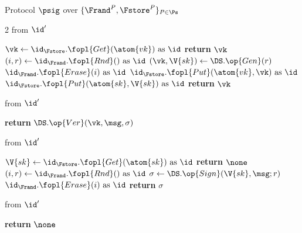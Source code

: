 \documentclass[10pt,oneside,openany]{book}
\theoremstyle{accentdef}
\theoremstyle{accentplain}
\begin{document}
\begin{interface}[nofloat]{Protocol $\psig$ over $\{\Frand^{P},\Fstore^{P}\}_{P \in \Ps}$ \\
\params{$\PID$, \quad $\Ps$, \quad $\admits$, \quad
$\uses := \{(\Frand,\serves),(\Fstore,\serves)\}$, \quad $\pars := \DS$}}

{\scriptsize
\setlength{\columnsep}{1.4em}
\begin{multicols}{2}
 \quad from $\id'$
\begin{algorithmic}[1]
\setcounter{contline}{0}\algcont
\State $\vk \gets \id_{\Fstore}.\fopl{Get}(\atom{vk}) \text{ as } \id$ \label{ln:psgetvk}
\If{$\vk \neq \rej$}
  \State \textbf{return} $\vk$
\EndIf
\State $(i,r) \gets \id_{\Frand}.\fopl{Rnd}() \text{ as } \id$
\State $(\vk,\V{sk}) \gets \DS.\op{Gen}(r)$ \label{ln:psgen}
\State $\id_{\Frand}.\fopl{Erase}(i) \text{ as } \id$ \label{ln:pserase}
\State $\id_{\Fstore}.\fopl{Put}(\atom{vk},\vk) \text{ as } \id$
\State $\id_{\Fstore}.\fopl{Put}(\atom{sk},\V{sk}) \text{ as } \id$
\State \textbf{return} $\vk$
\algsave
\end{algorithmic}
\vspace{1.4ex}

 \quad from $\id'$
\begin{algorithmic}[1]
\algcont
\State \textbf{return} $\DS.\op{Ver}(\vk,\msg,\sigma)$ \label{ln:psver}
\algsave
\end{algorithmic}

\columnbreak

 \quad from $\id'$
\begin{algorithmic}[1]
\algcont
\State $\V{sk} \gets \id_{\Fstore}.\fopl{Get}(\atom{sk}) \text{ as } \id$
  \State \textbf{return} $\none$
\EndIf
\State $(i,r) \gets \id_{\Frand}.\fopl{Rnd}() \text{ as } \id$
\State $\sigma \gets \DS.\op{Sign}(\V{sk},\msg;r)$ \label{ln:pssign}
\State $\id_{\Frand}.\fopl{Erase}(i) \text{ as } \id$
\State \textbf{return} $\sigma$
\algsave
\end{algorithmic}
\vspace{1.4ex}

 \quad from $\id'$
\begin{algorithmic}[1]
\algcont
\State \textbf{return} $\none$
\algsave
\end{algorithmic}
\end{multicols}}
\end{interface}
\end{document}

